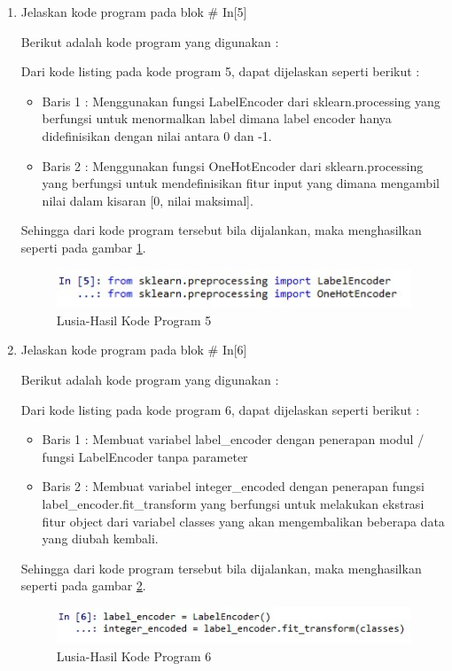 \begin{enumerate}
\item Jelaskan kode program pada blok \# In[5]
	\par Berikut adalah kode program yang digunakan :
	
	\par Dari kode listing pada kode program 5, dapat dijelaskan seperti berikut :
	\begin{itemize}
	\item Baris 1	: Menggunakan fungsi LabelEncoder dari sklearn.processing yang berfungsi untuk menormalkan label dimana label encoder hanya didefinisikan dengan nilai antara 0 dan -1.
	\item Baris 2	: Menggunakan fungsi OneHotEncoder dari sklearn.processing yang berfungsi untuk mendefinisikan fitur input yang dimana mengambil nilai dalam kisaran [0, nilai maksimal].
	\end{itemize}
	\par Sehingga dari kode program tersebut bila dijalankan, maka menghasilkan seperti pada gambar \ref{7B5}.
		\begin{figure}[!hbtp]
		\centering
		\includegraphics[scale=0.5]{figures/w5.jpg}
		\caption{Lusia-Hasil Kode Program 5}
		\label{7B5}
		\end{figure}
	
\item Jelaskan kode program pada blok \# In[6]
	\par Berikut adalah kode program yang digunakan :
	
	\par Dari kode listing pada kode program 6, dapat dijelaskan seperti berikut :
	\begin{itemize}
	\item Baris 1	: Membuat variabel label\_encoder dengan penerapan modul / fungsi LabelEncoder tanpa parameter
	\item Baris 2	: Membuat variabel integer\_encoded dengan penerapan fungsi label\_encoder.fit\_transform yang berfungsi untuk melakukan ekstrasi fitur object dari variabel classes yang akan mengembalikan beberapa data yang diubah kembali.
	\end{itemize}
	\par Sehingga dari kode program tersebut bila dijalankan, maka menghasilkan seperti pada gambar \ref{7B6}.
		\begin{figure}[!hbtp]
		\centering
		\includegraphics[scale=0.5]{figures/w6.jpg}
		\caption{Lusia-Hasil Kode Program 6}
		\label{7B6}
		\end{figure}


\end{enumerate}
